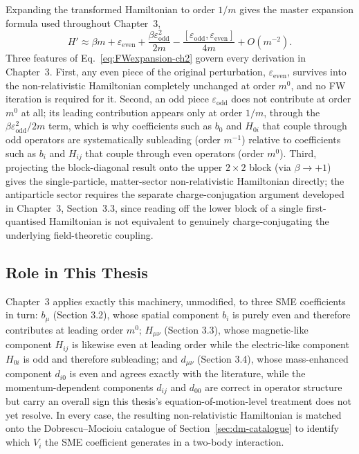 \documentclass[main]{subfiles}
\begin{document}
Expanding the transformed Hamiltonian to order $1/m$ gives the master
expansion formula used throughout Chapter~3,
\begin{equation}
  H' \approx \beta m + \varepsilon_{\text{even}}
  + \frac{\beta\varepsilon_{\text{odd}}^2}{2m}
  - \frac{[\varepsilon_{\text{odd}},\varepsilon_{\text{even}}]}{4m}
  + O(m^{-2}). \label{eq:FWexpansion-ch2}
\end{equation}
Three features of Eq.~\eqref{eq:FWexpansion-ch2} govern every derivation in
Chapter~3. First, any even piece of the original perturbation,
$\varepsilon_{\text{even}}$, survives into the non-relativistic Hamiltonian
completely unchanged at order $m^0$, and no FW iteration is required for it.
Second, an odd piece $\varepsilon_{\text{odd}}$ does not contribute at order
$m^0$ at all; its leading contribution appears only at order $1/m$, through
the $\beta\varepsilon_{\text{odd}}^2/2m$ term, which is why coefficients such
as $b_0$ and $H_{0i}$ that couple through odd operators are systematically
subleading (order $m^{-1}$) relative to coefficients such as $b_i$ and
$H_{ij}$ that couple through even operators (order $m^0$). Third, projecting
the block-diagonal result onto the upper $2\times2$ block (via $\beta\to+1$)
gives the single-particle, matter-sector non-relativistic Hamiltonian
directly; the antiparticle sector requires the separate charge-conjugation
argument developed in Chapter~3, Section~3.3, since reading off the lower
block of a single first-quantised Hamiltonian is not equivalent to
genuinely charge-conjugating the underlying field-theoretic coupling.

\subsection{Role in This Thesis}

Chapter~3 applies exactly this machinery, unmodified, to three SME
coefficients in turn: $b_\mu$ (Section 3.2), whose spatial component
$b_i$ is purely even and therefore contributes at leading order $m^0$;
$H_{\mu\nu}$ (Section 3.3), whose magnetic-like component $H_{ij}$ is
likewise even at leading order while the electric-like component $H_{0i}$ is
odd and therefore subleading; and $d_{\mu\nu}$ (Section 3.4), whose
mass-enhanced component $d_{i0}$ is even and agrees exactly with the
literature, while the momentum-dependent components $d_{ij}$ and $d_{00}$
are correct in operator structure but carry an overall sign this thesis's
equation-of-motion-level treatment does not yet resolve. In every
case, the resulting non-relativistic Hamiltonian is matched onto the
Dobrescu--Mocioiu catalogue of Section~\ref{sec:dm-catalogue} to identify
which $V_i$ the SME coefficient generates in a two-body interaction.
\end{document}
